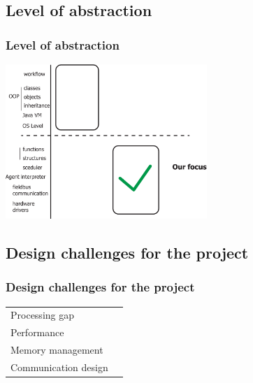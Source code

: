 \documentclass{beamer}
\theoremstyle{definition} \newtheorem{mdefinition}{Definition}
\theoremstyle{plain} \newtheorem{mtheorem}{Theorem}
\theoremstyle{plain} \newtheorem{mcorollary}{Corollary}
\theoremstyle{plain} \newtheorem{mfact}{Fact}
\begin{document}
\subsection{Level of abstraction}
\begin{frame}
\frametitle{Level of abstraction}
\begin{centering}
\includegraphics[width=3in]{img/abstraction-3-eps-converted-to.pdf}
\end{centering}
\end{frame}

\subsection{Design challenges for the project}
\begin{frame}
\frametitle{Design challenges for the project}
\begin{tabular}{ll}
Processing gap & \\

Performance & \\

Memory management & \\

Communication design & \\
\end{tabular}

\end{frame}
\end{document}
